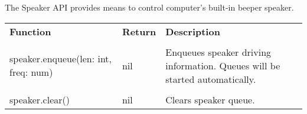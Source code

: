 The Speaker API provides means to control computer's built-in beeper speaker.

\begin{tabularx}{\textwidth}{l l X}
	\textbf{\large Function} & \textbf{\large Return} & \textbf{\large Description}
	\\ \\
	\endhead
	speaker.enqueue(len: int, freq: num) & nil & Enqueues speaker driving information. Queues will be started automatically.
	\\ \\
	speaker.clear() & nil & Clears speaker queue.
\end{tabularx}